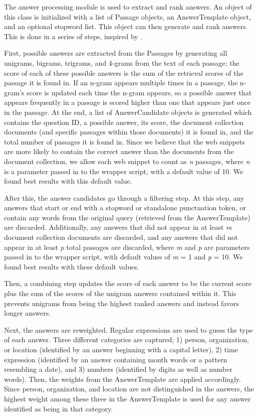 \documentclass[11pt]{article}
\begin{document}
The answer processing module is used to extract and rank answers.  An object of this class is initialized with a list of Passage objects, an AnswerTemplate object, and an optional stopword list.  This object can then generate and rank answers.  This is done in a series of steps, inspired by .

First, possible answers are extracted from the Passages by generating all unigrams, bigrams, trigrams, and 4-grams from the text of each passage; the score of each of these possible answers is the sum of the retrieval scores of the passage it is found in.  If an n-gram appears multiple times in a passage, the n-gram's score is updated each time the n-gram appears, so a possible answer that appears frequently in a passage is scored higher than one that appears just once in the passage. At the end, a list of AnswerCandidate objects is generated which contains the question ID, a possible answer, its score, the document collection documents (and specific passages within those documents) it is found in, and the total number of passages it is found in.  Since we believe that the web snippets are more likely to contain the correct answer than the documents from the document collection, we allow each web snippet to count as \emph{n} passages, where \emph{n} is a parameter passed in to the wrapper script, with a default value of 10.  We found best results with this default value.

After this, the answer candidates go through a filtering step.  At this step, any answers that start or end with a stopword or standalone punctuation token, or contain any words from the original query (retrieved from the AnswerTemplate) are discarded.  Additionally, any answers that did not appear in at least \emph{m} document collection documents are discarded, and any answers that did not appear in at least \emph{p} total passages are discarded, where \emph{m} and \emph{p} are parameters passed in to the wrapper script, with default values of \emph{m} = 1 and \emph{p} = 10.  We found best results with these default values.

Then, a combining step updates the score of each answer to be the current score plus the sum of the scores of the unigram answers contained within it. This prevents unigrams from being the highest ranked answers and instead favors longer answers.

Next, the answers are reweighted.  Regular expressions are used to guess the type of each answer.  Three different categories are captured; 1) person, organization, or location (identified by an answer beginning with a capital letter), 2) time expression (identified by an answer containing month words or a pattern resembling a date), and 3) numbers (identified by digits as well as number words).  Then, the weights from the AnswerTemplate are applied accordingly.  Since person, organization, and location are not distinguished in the answers, the highest weight among these three in the AnswerTemplate is used for any answer identified as being in that category.
\end{document}
